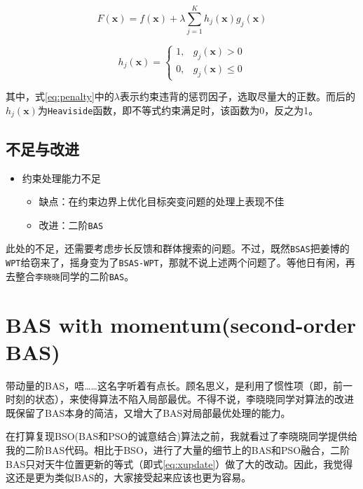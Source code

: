 \documentclass[]{ctexbook}
\providecommand{\tightlist}{%
  \setlength{\itemsep}{0pt}\setlength{\parskip}{0pt}}
\theoremstyle{definition}
\theoremstyle{definition}
\theoremstyle{definition}
\theoremstyle{remark}
\begin{document}
\begin{equation}
F(\mathbf{x})=f(\mathbf{x})+\lambda\sum_{j=1}^{K}h_j(\mathbf{x})g_j(\mathbf{x})
\label{eq:penalty}
\end{equation}

\begin{equation}
h_j(\mathbf{x}) = \begin{cases} 
1, & g_j(\mathbf{x})>0 \\ 
0, & g_j(\mathbf{x})\leq0
\end{cases}
\label{eq:violation}
\end{equation}

其中，式\eqref{eq:penalty}中的\(\lambda\)表示约束违背的惩罚因子，选取尽量大的正数。而后的\(h_j(\mathbf{x})\)为\texttt{Heaviside}函数，即不等式约束满足时，该函数为0，反之为1。

\subsection{不足与改进}\label{BSASimprove}

\begin{itemize}
\tightlist
\item
  约束处理能力不足

  \begin{itemize}
  \tightlist
  \item
    缺点：在约束边界上优化目标突变问题的处理上表现不佳
  \item
    改进：二阶\texttt{BAS}
  \end{itemize}
\end{itemize}

此处的不足，还需要考虑步长反馈和群体搜索的问题。不过，既然\texttt{BSAS}把姜博的\texttt{WPT}给窃来了，摇身变为了\texttt{BSAS-WPT}，那就不说上述两个问题了。等他日有闲，再去整合\texttt{李晓晓}同学的二阶\texttt{BAS}。

\section{BAS with momentum(second-order BAS)}\label{BAS2}

带动量的BAS，唔\ldots{}\ldots{}这名字听着有点长。顾名思义，是利用了惯性项（即，前一时刻的状态），来使得算法不陷入局部最优。不得不说，李晓晓同学对算法的改进既保留了BAS本身的简洁，又增大了BAS对局部最优处理的能力。

在打算复现BSO(BAS和PSO的诚意结合)算法之前，我就看过了李晓晓同学提供给我的二阶BAS代码。相比于BSO，进行了大量的细节上的BAS和PSO融合，二阶BAS只对天牛位置更新的等式（即式\eqref{eq:xupdate}）做了大的改动。因此，我觉得这还是更为类似BAS的，大家接受起来应该也更为容易。
\end{document}
